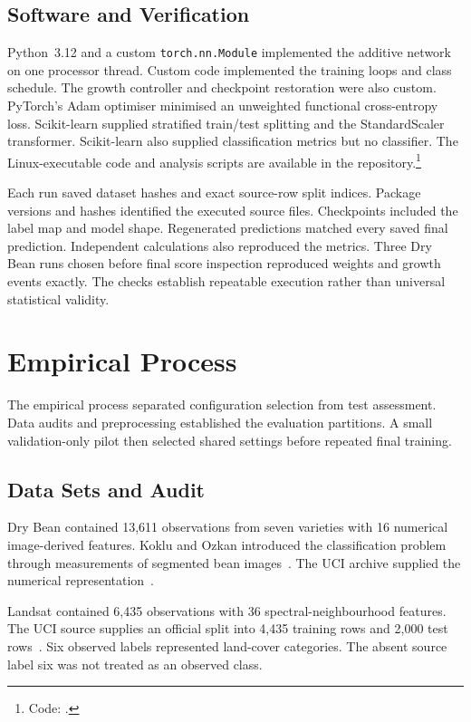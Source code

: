 \documentclass[conference,10pt]{IEEEtran}
\begin{document}
\subsection{Software and Verification}

Python~3.12 and a custom \texttt{torch.nn.Module} implemented the additive network on one processor thread. Custom code implemented the training loops and class schedule. The growth controller and checkpoint restoration were also custom. PyTorch's Adam optimiser minimised an unweighted functional cross-entropy loss. Scikit-learn supplied stratified train/test splitting and the StandardScaler transformer. Scikit-learn also supplied classification metrics but no classifier. The Linux-executable code and analysis scripts are available in the repository.\footnote{Code: .}

Each run saved dataset hashes and exact source-row split indices. Package versions and hashes identified the executed source files. Checkpoints included the label map and model shape. Regenerated predictions matched every saved final prediction. Independent calculations also reproduced the metrics. Three Dry Bean runs chosen before final score inspection reproduced weights and growth events exactly. The checks establish repeatable execution rather than universal statistical validity.

\section{Empirical Process}

The empirical process separated configuration selection from test assessment. Data audits and preprocessing established the evaluation partitions. A small validation-only pilot then selected shared settings before repeated final training.

\subsection{Data Sets and Audit}

Dry Bean contained 13,611 observations from seven varieties with 16 numerical image-derived features. Koklu and Ozkan introduced the classification problem through measurements of segmented bean images~\cite{koklu2020}. The UCI archive supplied the numerical representation~\cite{ucidrybean}.

Landsat contained 6,435 observations with 36 spectral-neighbourhood features. The UCI source supplies an official split into 4,435 training rows and 2,000 test rows~\cite{ucilandsat}. Six observed labels represented land-cover categories. The absent source label six was not treated as an observed class.
\end{document}
